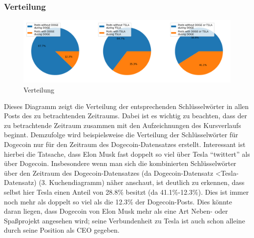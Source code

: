 \documentclass{article}
\begin{document}
\subsubsection{Verteilung}
\begin{figure}[h]
  	\centering
  	\includegraphics[width=\textwidth]{./imgs/Verteilung.png}
 	\caption{Verteilung}
 	\label{fig:Verteilung}
\end{figure}
Dieses Diagramm zeigt die Verteilung der entsprechenden Schlüsselwörter in allen Posts des zu betrachtenden Zeitraums.
Dabei ist es wichtig zu beachten, dass der zu betrachtende Zeitraum zusammen mit den Aufzeichnungen des Kursverlaufs beginnt.
Demzufolge wird beispielsweise die Verteilung der Schlüsselwörter für Dogecoin nur für den Zeitraum des Dogecoin-Datensatzes erstellt.
Interessant ist hierbei die Tatsache, dass Elon Musk fast doppelt so viel über Tesla ``twittert'' als über Dogecoin.
Insbesondere wenn man sich die kombinierten Schlüsselwörter über den Zeitraum des Dogecoin-Datensatzes (da Dogecoin-Datensatz \textless Tesla-Datensatz) (3. Kuchendiagramm) näher anschaut, ist deutlich zu erkennen, dass selbst hier Tesla einen Anteil von 28.8\% besitzt (da 41.1\%-12.3\%).
Dies ist immer noch mehr als doppelt so viel als die 12.3\% der Dogecoin-Posts.
Dies könnte daran liegen, dass Dogecoin von Elon Musk mehr als eine Art Neben- oder Spaßprojekt angesehen wird; seine Verbundenheit zu Tesla ist auch schon alleine durch seine Position als CEO gegeben.
\end{document}
